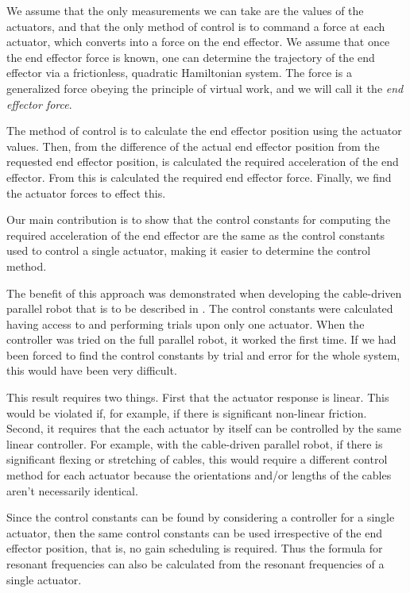 \documentclass[reqno,twocolumn]{amsart}
\begin{document}
We assume that the only measurements we can take are the values of the actuators, and that the only method of control is to command a force at each actuator, which converts into a force on the end effector.  We assume that once the end effector force is known, one can determine the trajectory of the end effector via a frictionless, quadratic Hamiltonian system.  The force is a generalized force obeying the principle of virtual work, and we will call it the \emph{end effector force}.

The method of control is to calculate the end effector position using the actuator values.  Then, from the difference of the actual end effector position from the requested end effector position, is calculated the required acceleration of the end effector.  From this is calculated the required end effector force.  Finally, we find the actuator forces to effect this.

Our main contribution is to show that the control constants for computing the required acceleration of the end effector are the same as the control constants used to control a single actuator, making it easier to determine the control method.

The benefit of this approach was demonstrated when developing the cable-driven parallel robot that is to be described in \cite{montgomery-smith}.  The control constants were calculated having access to and performing trials upon only one actuator.  When the controller was tried on the full parallel robot, it worked the first time.  If we had been forced to find the control constants by trial and error for the whole system, this would have been very difficult.

This result requires two things.  First that the actuator response is linear.  This would be violated if, for example, if there is significant non-linear friction.  Second, it requires that the each actuator by itself can be controlled by the same linear controller.  For example, with the cable-driven parallel robot, if there is significant flexing or stretching of cables, this would require a different control method for each actuator because the orientations and/or lengths of the cables aren't necessarily identical.

Since the control constants can be found by considering a controller for a single actuator, then the same control constants can be used irrespective of the end effector position, that is, no gain scheduling is required.  Thus the formula for resonant frequencies can also be calculated from the resonant frequencies of a single actuator.  
\end{document}
